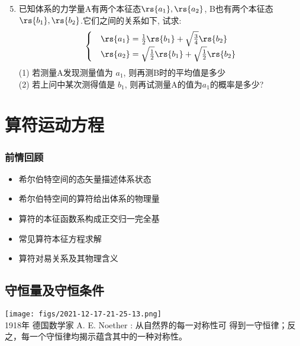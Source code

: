 \begin{frame}
    \frametitle{}
    \begin{enumerate}
    \setcounter{enumi}{4}
    \item 已知体系的力学量A有两个本征态$\rs{a_1}, \rs{a_2}$, B也有两个本征态$\rs{b_1}, \rs{b_2}$.它们之间的关系如下, 试求: \\
        \[ \begin{cases}
            &\rs{a_1} =\frac{1}{2} \rs{b_1} +  \sqrt{\frac{3}{4}} \rs{b_2} \\
            &\rs{a_2} =\sqrt{\frac{1}{2}} \rs{b_1} +  \sqrt{\frac{1}{2}} \rs{b_2} 
        \end{cases} \]
        (1) 若测量A发现测量值为 $a_1$, 则再测B时的平均值是多少\\
        (2) 若上问中某次测得值是 $b_1$, 则再试测量A的值为$a_1$的概率是多少?
    \end{enumerate}
\end{frame}


\section{算符运动方程}

\begin{frame}
    \frametitle{前情回顾}
    \begin{itemize}
        \item 希尔伯特空间的态矢量描述体系状态
        \item 希尔伯特空间的算符给出体系的物理量
        \item 算符的本征函数系构成正交归一完全基
        \item 常见算符本征方程求解
        \item 算符对易关系及其物理含义 
    \end{itemize}   
\end{frame} 

\subsection{守恒量及守恒条件}

\begin{frame}
\texttt{[image: figs/2021-12-17-21-25-13.png]} \\
1918年 德国数学家 A. E. Noether : 从自然界的每一对称性可
得到一守恒律；反之，每一个守恒律均揭示蕴含其中的一种对称性。
\end{frame} 

